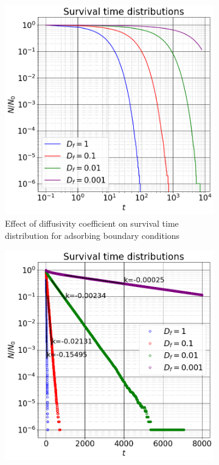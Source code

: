 \documentclass{article}
\begin{document}
\begin{figure}[htbp]
    \centering
    \begin{subfigure}[b]{0.45\textwidth}
        \centering
        \includegraphics[width=\textwidth]{images/survTimeDistCompareDiff.png}
        \caption{Effect of diffusivity coefficient on survival time distribution for adsorbing boundary conditions}
    \end{subfigure}
    \hfill
    \begin{subfigure}[b]{0.45\textwidth}
        \centering
        \includegraphics[width=\textwidth]{images/survTimeDistCompareDiffNorm.png}

\end{subfigure}
\end{figure}
\end{document}
